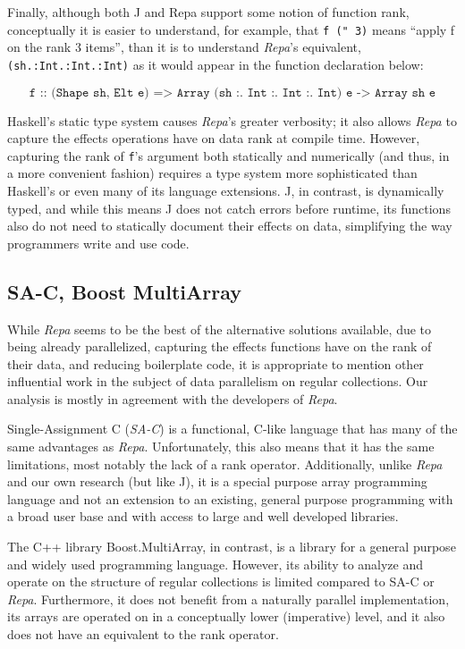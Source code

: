 Finally, although both J and Repa support some notion of function rank, 
conceptually it is easier to understand, for example, 
that \texttt{f (" 3)} means ``apply f on the rank 3 items'', than it is to understand \textit{Repa}'s equivalent, 
\texttt{(sh.:Int.:Int.:Int)} as it would appear in the function declaration below: 

\[\texttt{f :: (Shape sh, Elt e) => Array (sh :. Int :. Int :. Int) e -> Array sh e} \]

\noindent Haskell's static type system causes \textit{Repa}'s greater verbosity; 
it also allows \textit{Repa} to capture the effects operations have on data rank at compile time. 
However, capturing the rank of \texttt{f}'s argument both statically and numerically (and thus, in a more convenient fashion)
requires a type system more sophisticated than Haskell's or even many of its language extensions. %
J, in contrast, is dynamically typed, and while this means J does not catch errors before runtime, 
its functions also do not need to statically document their effects on data, simplifying the way programmers write and use code.

\subsection{SA-C, Boost MultiArray}
While \textit{Repa} seems to be the best of the alternative solutions available, 
due to being already parallelized, capturing the effects functions have on the rank of their data, 
and reducing boilerplate code, 
it is appropriate to mention other influential work in the subject of data parallelism on regular collections.
Our analysis is mostly in agreement with the developers of \textit{Repa}\cite{dph}.

Single-Assignment C (\textit{SA-C}) is a functional, C-like language 
that has many of the same advantages as \textit{Repa}\cite{dph}\cite{sac}.
Unfortunately, this also means that it has the same limitations, most notably the lack of a rank operator.
Additionally, unlike \textit{Repa} and our own research (but like J), 
it is a special purpose array programming language and 
not an extension to an existing, general purpose programming with a broad user base and 
with access to large and well developed libraries.

The C++ library Boost.MultiArray, in contrast, is a library for a general purpose and widely used programming language\cite{boost}.
However, its ability to analyze and operate on the structure of regular collections is limited compared to SA-C or \textit{Repa}.
Furthermore, it does not benefit from a naturally parallel implementation, 
its arrays are operated on in a conceptually lower (imperative) level, 
and it also does not have an equivalent to the rank operator. 
